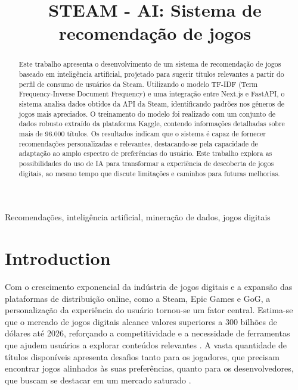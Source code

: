 \documentclass[conference]{IEEEtran}
\begin{document}
\title{STEAM - AI: Sistema de recomendação de jogos\\
}

\author{

\and

}

\maketitle

\begin{abstract}
Este trabalho apresenta o desenvolvimento de um sistema de recomendação de jogos baseado em inteligência artificial, projetado para sugerir títulos relevantes a partir do perfil de consumo de usuários da Steam. Utilizando o modelo TF-IDF (Term Frequency-Inverse Document Frequency) e uma integração entre Next.js e FastAPI, o sistema analisa dados obtidos da API da Steam, identificando padrões nos gêneros de jogos mais apreciados. O treinamento do modelo foi realizado com um conjunto de dados robusto extraído da plataforma Kaggle, contendo informações detalhadas sobre mais de 96.000 títulos. Os resultados indicam que o sistema é capaz de fornecer recomendações personalizadas e relevantes, destacando-se pela capacidade de adaptação ao amplo espectro de preferências do usuário. Este trabalho explora as possibilidades do uso de IA para transformar a experiência de descoberta de jogos digitais, ao mesmo tempo que discute limitações e caminhos para futuras melhorias.
\end{abstract}

\begin{IEEEkeywords}
Recomendações, inteligência artificial, mineração de dados, jogos digitais
\end{IEEEkeywords}

\section{Introduction}

Com o crescimento exponencial da indústria de jogos digitais e a expansão das plataformas de distribuição online, como a Steam, Epic Games e GoG, a personalização da experiência do usuário tornou-se um fator central. Estima-se que o mercado de jogos digitais alcance valores superiores a 300 bilhões de dólares até 2026, reforçando a competitividade e a necessidade de ferramentas que ajudem usuários a explorar conteúdos relevantes \cite{c1}. A vasta quantidade de títulos disponíveis apresenta desafios tanto para os jogadores, que precisam encontrar jogos alinhados às suas preferências, quanto para os desenvolvedores, que buscam se destacar em um mercado saturado \cite{c2}.
\end{document}
